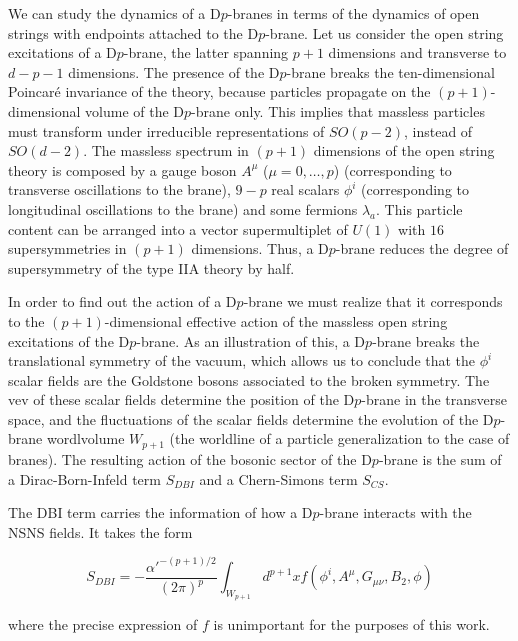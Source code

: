 We can study the dynamics of a D$p$-branes in terms of the dynamics of open strings with endpoints
attached to the D$p$-brane.
Let us consider the open string excitations of a D$p$-brane, the latter spanning $p+1$ dimensions and transverse to $d-p-1$ dimensions.
The presence of the D$p$-brane breaks the ten-dimensional Poincaré invariance of the theory, because
particles propagate on the $(p+1)$-dimensional volume of the D$p$-brane only.
This implies that massless particles must transform under irreducible representations of $SO(p-2)$, instead of
$SO(d-2)$.
The massless spectrum in $(p+1)$ dimensions of the open string theory is composed by a gauge boson $A^\mu$ ($\mu=0,\ldots,p$) (corresponding
to transverse oscillations to the brane),
$9-p$ real scalars $\phi^i$ (corresponding to longitudinal oscillations to the brane) and some fermions $\lambda_a$.
This particle content can be arranged into a vector supermultiplet of $U(1)$ with $16$ supersymmetries
in $(p+1)$ dimensions. 
Thus, a D$p$-brane reduces the degree of supersymmetry of the type IIA theory by half.

In order to find out the action of a D$p$-brane we must realize that it corresponds to the
$(p+1)$-dimensional effective action of the massless open string excitations of the D$p$-brane.
As an illustration of this, a D$p$-brane breaks the translational symmetry of the vacuum, which allows
us to conclude that the $\phi^i$ scalar fields are the Goldstone bosons associated to the broken symmetry. 
The vev of these scalar fields determine the position of the D$p$-brane in the transverse space, and the fluctuations of the scalar
fields determine the evolution of the D$p$-brane wordlvolume $W_{p+1}$ (the worldline of a particle generalization to the case of branes). 
The resulting action of the bosonic sector of the D$p$-brane is the sum of a Dirac-Born-Infeld term $S_{DBI}$ and a Chern-Simons term $S_{CS}$.

The DBI term carries the information of how a D$p$-brane interacts with the NSNS fields. 
It takes the form

\begin{equation}
  S_{DBI}= -\frac{\alpha'^{-(p+1)/2}}{(2\pi)^p}\int_{W_{p+1}}  d^{p+1}x f(\phi^i, A^\mu, G_{\mu\nu}, B_2, \phi)
\end{equation}

where the precise expression of $f$ is unimportant for the purposes of this work.

